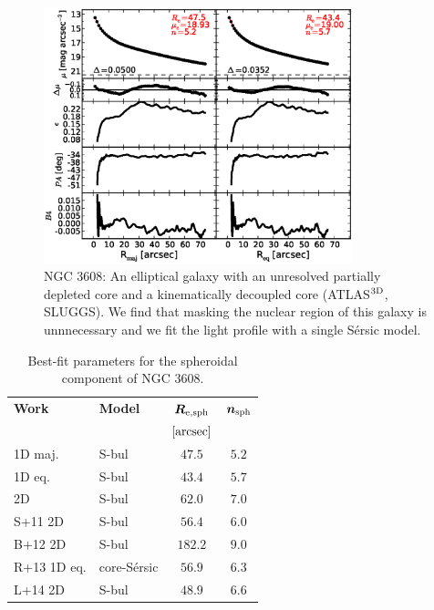 \documentclass[preprint2]{emulateapj}
\newcommand{\fitfigurewidth}{0.8\textwidth}
\begin{document}
  \begin{figure}[h]
  \begin{center}
  \includegraphics[width=\fitfigurewidth]{images/n3608_1Dfit.eps}
  \caption{NGC 3608: 
  An elliptical galaxy with an unresolved partially depleted core \citep{rusli2013} 
  and a kinematically decoupled core (ATLAS$^{\rm 3D}$, SLUGGS). 
  We find that masking the nuclear region of this galaxy is unnnecessary and we fit the light profile with a single S\'ersic model.
  }
  \end{center}
  \end{figure}
  
  \begin{table}[h]
  \small
  \caption{Best-fit parameters for the spheroidal component of NGC 3608.}
  \begin{center}
  \begin{tabular}{llcc}
  \hline
  {\bf Work} & {\bf Model}   & $\bm R_{\rm e,sph}$    & $\bm n_{\rm sph}$ \\
    &  &  $[\rm arcsec]$ & \\
  \hline
  1D maj. & S-bul & $47.5$  &  $5.2$ \\
  1D eq.  & S-bul & $43.4$  &  $5.7$ \\
  2D      & S-bul & $62.0$  &  $7.0$ \\
  \hline
  S+11 2D         & S-bul            & $56.4$  &  $6.0$ \\
  B+12 2D         & S-bul            & $182.2$  &  $9.0$ \\
  R+13 1D eq.         & core-S\'ersic    & $56.9$  &  $6.3$ \\
  L+14 2D         & S-bul            & $48.9$  &  $6.6$ \\
  \hline
  \end{tabular}
  \end{center}
  \label{tab:n3608}
  \end{table}
\end{document}
